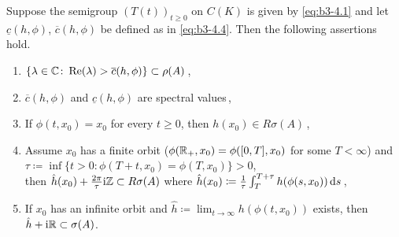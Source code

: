 \begin{proposition}\label{prop:b3-4.8}
	Suppose the semigroup $(T(t))_{t\geq 0}$ on $C(K)$ is given by \eqref{eq:b3-4.1} and let $\underline{c}(h,\phi)$, $\overline{c}(h,\phi)$ be defined as in \eqref{eq:b3-4.4}.
	Then the following assertions hold.
	\begin{enumerate}[\upshape (i)]
		\item 
		$\{\lambda \in \mathbb{C} \colon \mathop{}\!\mathrm{Re}(\lambda) > \overline{c}(h,\phi)\} \subset \rho(A)$\,,
		
		\item 
		$\overline{c}(h,\phi)$ and $\underline{c}(h,\phi)$ are spectral values\,,
		
		\item 
		If $\phi(t,x_{0}) = x_{0}$ for every $t \geq 0$, then $h(x_{0}) \in R{\sigma}(A)$\,,
		
		\item 
		Assume $x_{0}$ has a finite orbit (\ie $\phi(\mathbb{R}_{+},x_{0}) = \phi([0,T],x_{0})$ for some $T < \infty$) and $\tau \coloneq \inf\{t > 0 \colon \phi(T+t,x_{0}) = \phi(T,x_{0})\} > 0$, \\
		then $\hat{h}(x_{0}) + \frac{2\pi}{\tau}\mathrm{i}\mathbb{Z} \subset R{\sigma}(A)$ where $\hat{h}(x_{0}) \coloneq	\frac{1}{\tau}\int_{T}^{T+\tau}h(\phi(s,x_{0}))\mathop{}\!\mathrm{d}{s} $\,,
		
		\item 
		If $x_{0}$ has an infinite orbit and $\hat{h} \coloneq  \lim_{t\to\infty}h(\phi(t,x_{0}))$ exists, then $\hat{h} + \mathrm{i}\mathbb{R} \subset \sigma(A)$.
	\end{enumerate}
\end{proposition}

